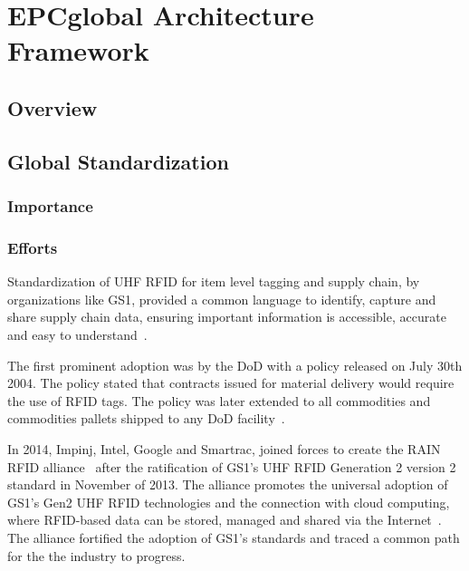 \chapter{EPCglobal Architecture Framework}

\section{Overview}

\section{Global Standardization}

\subsection{Importance}


\subsection{Efforts}

Standardization of \gls{UHF RFID} for item level tagging and \gls{supply chain}, by organizations like \gls{GS1}, provided a common language to identify, capture and share supply chain data, ensuring important information is accessible, accurate and easy to understand~\cite{anonymousStandardsGS12014}.

The first prominent adoption was by the \gls{DoD} with a policy released on July 30th 2004. The policy stated that contracts issued for material delivery would require the use of RFID tags. The policy was later extended to all commodities and commodities pallets shipped to any \gls{DoD} facility~\cite{DoDSuppliersPassive, DODReleasesFinal}.

In 2014, Impinj, Intel, Google and Smartrac, joined forces to create the \gls{RAIN RFID} alliance~\cite{TechnologyCompaniesCreate} after the ratification of \gls{GS1}'s \gls{UHF RFID} Generation 2 version 2 standard in November of 2013. The alliance promotes the universal adoption of \gls{GS1}'s Gen2 \gls{UHF RFID} technologies and the connection with \gls{cloud computing}, where RFID-based data can be stored, managed and shared via the Internet~\cite{WhatRAINRFID}.
The alliance fortified the adoption of \gls{GS1}'s standards and traced a common path for the the industry to progress.

